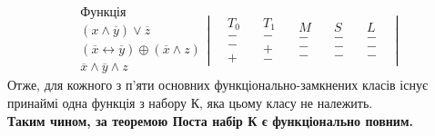 \documentclass[14pt,a4paper]{scrartcl}
\theoremstyle{definition}
\theoremstyle{remark}
\theoremstyle{definition}
\theoremstyle{definition}
\begin{document}
$$\begin{gathered}
 \textbf{Функція} \\
 (x \wedge \overline{y}) \vee \overline{z} \\
 (\overline{x} \leftrightarrow \overline{y}) \oplus (\overline{x} \land z)\\
 \overline{x} \land \overline{y} \land z
\end{gathered}
\left|
\quad
\begin{gathered}
T_0\\
-\\
-\\
+
\end{gathered}
\quad
\begin{gathered}
 T_1\\
 -\\
 +\\
 -
\end{gathered}
\quad
\begin{gathered}
 M\\
 -\\
 -\\
 -
\end{gathered}
\quad
\begin{gathered}
 S\\
 -\\
 -\\
 -
\end{gathered}
\quad
\begin{gathered}
 L\\
 -\\
 -\\
 -
\end{gathered}
\quad
 \right|
$$Отже, для кожного з п'яти основних функціонально-замкнених класів існує принаймі одна функція з набору К, яка цьому класу не належить.\\
\textbf{Таким чином, за теоремою Поста набір К є функціонально повним.}
\end{document}

